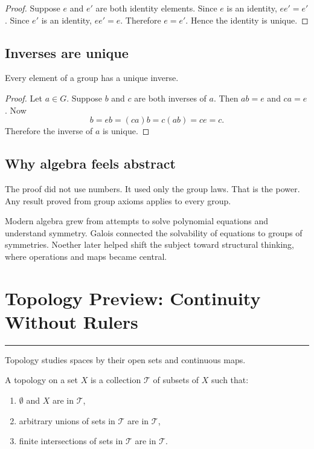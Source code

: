 \documentclass[12pt]{article}
\newcommand{\chapterline}{\vspace{0.4em}\hrule\vspace{0.8em}}
\begin{document}
\begin{proof}
Suppose $e$ and $e'$ are both identity elements. Since $e$ is an identity, $ee'=e'$. Since $e'$ is an identity, $ee'=e$. Therefore $e=e'$. Hence the identity is unique.
\end{proof}

\subsection{Inverses are unique}

\begin{theorem}
Every element of a group has a unique inverse.
\end{theorem}

\begin{proof}
Let $a\in G$. Suppose $b$ and $c$ are both inverses of $a$. Then $ab=e$ and $ca=e$. Now
\[
b=eb=(ca)b=c(ab)=ce=c.
\]
Therefore the inverse of $a$ is unique.
\end{proof}

\subsection{Why algebra feels abstract}

The proof did not use numbers. It used only the group laws. That is the power. Any result proved from group axioms applies to every group.

\begin{historybox}
Modern algebra grew from attempts to solve polynomial equations and understand symmetry. Galois connected the solvability of equations to groups of symmetries. Noether later helped shift the subject toward structural thinking, where operations and maps became central.
\end{historybox}

\newpage
\section{Topology Preview: Continuity Without Rulers}
\chapterline

Topology studies spaces by their open sets and continuous maps.

\begin{definition}
A topology on a set $X$ is a collection $\mathcal{T}$ of subsets of $X$ such that:
\begin{enumerate}
\item $\emptyset$ and $X$ are in $\mathcal{T}$,
\item arbitrary unions of sets in $\mathcal{T}$ are in $\mathcal{T}$,
\item finite intersections of sets in $\mathcal{T}$ are in $\mathcal{T}$.
\end{enumerate}
\end{definition}
\end{document}
